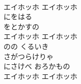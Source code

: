 \documentclass[10pt,b5j]{tarticle} %
\begin{document}
\begin{enumerate}
\begin{minipage}[c]{\blocksize}
    \end{minipage}
    \begin{minipage}[c]{\blocksize}
        
        \vspace{\linespace}
        \item~\\
        エイホッホ エイホッホ\\
        にをはる \\
        をとかすの\\
        エイホッホ エイホッホ\\
        のの くるいき\\
        さがつらけりゃ\\
        にさけべ おろかもの\\
        エイホッホ エイホッホ
    
    \end{minipage}
\end{enumerate} %
\end{document}

